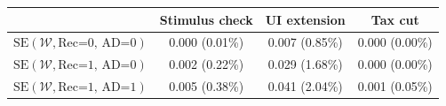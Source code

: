\begin{tabular}{@{}lccc@{}}
\toprule
                          & Stimulus check      & UI extension    & Tax cut    \\  \midrule
$\mathrm{SE}(\mathcal{W}, \text{Rec=0, AD=0})$ & 0.000 (0.01\%)  & 0.007 (0.85\%)  & 0.000 (0.00\%)     \\
$\mathrm{SE}(\mathcal{W}, \text{Rec=1, AD=0})$ & 0.002 (0.22\%)  & 0.029 (1.68\%)  & 0.000 (0.00\%)     \\
$\mathrm{SE}(\mathcal{W}, \text{Rec=1, AD=1})$ & 0.005 (0.38\%)  & 0.041 (2.04\%)  & 0.001 (0.05\%)     \\ \bottomrule
\end{tabular}
